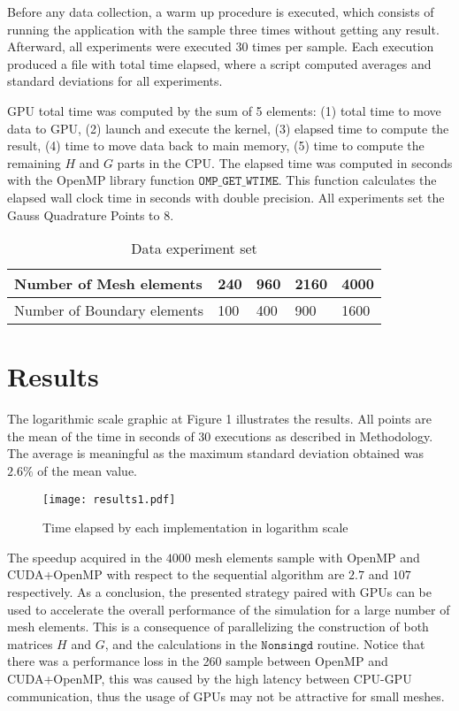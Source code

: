 Before any data collection, a warm up procedure is executed, which consists of running the 
application with the sample three times without getting any result. Afterward, all experiments 
were executed 30 times per sample. Each execution produced a file with total time elapsed, 
where a script computed averages and standard deviations for all experiments.

GPU total time was computed by the sum of 5 elements: 
(1) total time to move data to GPU, (2) launch and execute the kernel, (3) elapsed time 
to compute the result, (4) time to move data back to main memory, (5) time to compute 
the remaining $H$ and $G$ parts in the CPU. 
The elapsed time was computed in seconds with the OpenMP library function 
$\texttt{OMP\_GET\_WTIME}$. This function calculates the elapsed wall clock time in seconds 
with double precision. All experiments set the Gauss Quadrature Points to 8.

\begin{table}[]
\centering
\caption{Data experiment set}
\label{experiments}
\begin{tabular}{|l|l|l|l|l|}
\hline
Number of Mesh elements     & 240 & 960 & 2160 & 4000 \\ \hline
Number of Boundary elements & 100 & 400 & 900  & 1600 \\ \hline
\end{tabular}
\end{table}

\section{Results}


The logarithmic scale graphic at Figure 1 illustrates the results. All points are the mean of the 
time in seconds of 30 executions as described in Methodology. The average is meaningful as the maximum standard deviation
obtained was $2.6\%$ of the mean value.

\begin{figure}[ht]
\centering
\texttt{[image: results1.pdf]}
\caption{Time elapsed by each implementation in logarithm scale}
\label{fig:graphic1}
\end{figure}

The speedup acquired in the $4000$ mesh elements sample with OpenMP and CUDA+OpenMP with respect to the sequential 
algorithm are $2.7$ and $107$ respectively. As a conclusion, the presented strategy paired with GPUs can be 
used to accelerate the overall performance of the simulation for a large number of mesh elements. This is a consequence 
of parallelizing the construction of both matrices $H$ and $G$, and the calculations in the $\texttt{Nonsingd}$ routine. 
Notice that there was a performance loss in the 260 sample between OpenMP and CUDA+OpenMP, this was caused by the high 
latency between CPU-GPU communication, thus the usage of GPUs may not be attractive for small meshes.

